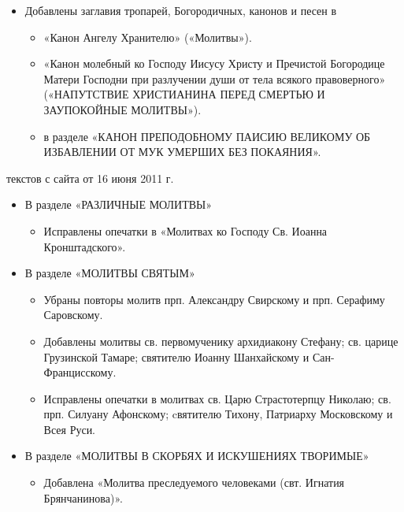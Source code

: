 {{\begin{itemize}
\item Добавлены заглавия тропарей, Богородичных, канонов и песен в

\begin{itemize}

\item «Канон Ангелу Хранителю» («Молитвы»).

\item «Канон молебный ко Господу Иисусу Христу и Пречистой Богородице Матери Господни при разлучении души от тела всякого правоверного» («НАПУТСТВИЕ ХРИСТИАНИНА ПЕРЕД СМЕРТЬЮ И ЗАУПОКОЙНЫЕ МОЛИТВЫ»).

\item в разделе «КАНОН ПРЕПОДОБНОМУ ПАИСИЮ ВЕЛИКОМУ ОБ ИЗБАВЛЕНИИ ОТ МУК УМЕРШИХ БЕЗ ПОКАЯНИЯ».

\end{itemize}
\end{itemize}}


{ текстов с сайта от 16 июня 2011 г.
\begin{itemize}

\item В разделе «РАЗЛИЧНЫЕ МОЛИТВЫ»
\begin{itemize}
\item Исправлены опечатки в «Молитвах ко Господу Св. Иоанна Кронштадского».
\end{itemize}

\item В разделе «МОЛИТВЫ СВЯТЫМ»
\begin{itemize}
\item Убраны повторы молитв прп. Александру Свирскому и прп. Серафиму Саровскому.
\item Добавлены молитвы св. первомученику архидиакону Стефану; св. царице Грузинской Тамаре; святителю Иоанну Шанхайскому и Сан-Францисскому.
\item Исправлены опечатки в молитвах св. Царю Страстотерпцу Николаю; св. прп. Силуану Афонскому; cвятителю Тихону, Патриарху Московскому и Всея Руси.
\end{itemize}

\item В разделе «МОЛИТВЫ В СКОРБЯХ И ИСКУШЕНИЯХ ТВОРИМЫЕ»
\begin{itemize}
\item Добавлена «Молитва преследуемого человеками (свт. Игнатия Брянчанинова)».
\end{itemize}


\end{itemize}}}
